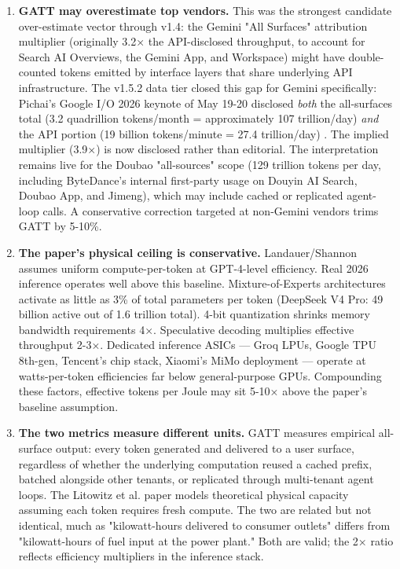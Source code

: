 \documentclass[11pt,a4paper]{article}
\begin{document}
\begin{enumerate}
  \item \textbf{GATT may overestimate top vendors.} This was the strongest candidate over-estimate vector through v1.4: the Gemini "All Surfaces" attribution multiplier (originally 3.2× the API-disclosed throughput, to account for Search AI Overviews, the Gemini App, and Workspace) might have double-counted tokens emitted by interface layers that share underlying API infrastructure. The v1.5.2 data tier closed this gap for Gemini specifically: Pichai's Google I/O 2026 keynote of May 19-20 disclosed \emph{both} the all-surfaces total (3.2 quadrillion tokens/month = approximately 107 trillion/day) \emph{and} the API portion (19 billion tokens/minute = 27.4 trillion/day) \cite{pichai2026io}. The implied multiplier (3.9×) is now disclosed rather than editorial. The interpretation remains live for the Doubao "all-sources" scope (129 trillion tokens per day, including ByteDance's internal first-party usage on Douyin AI Search, Doubao App, and Jimeng), which may include cached or replicated agent-loop calls. A conservative correction targeted at non-Gemini vendors trims GATT by 5-10\%.
  \item \textbf{The paper's physical ceiling is conservative.} Landauer/Shannon assumes uniform compute-per-token at GPT-4-level efficiency. Real 2026 inference operates well above this baseline. Mixture-of-Experts architectures activate as little as 3\% of total parameters per token (DeepSeek V4 Pro: 49 billion active out of 1.6 trillion total). 4-bit quantization shrinks memory bandwidth requirements 4×. Speculative decoding multiplies effective throughput 2-3×. Dedicated inference ASICs --- Groq LPUs, Google TPU 8th-gen, Tencent's chip stack, Xiaomi's MiMo deployment --- operate at watts-per-token efficiencies far below general-purpose GPUs. Compounding these factors, effective tokens per Joule may sit 5-10× above the paper's baseline assumption.
  \item \textbf{The two metrics measure different units.} GATT measures empirical all-surface output: every token generated and delivered to a user surface, regardless of whether the underlying computation reused a cached prefix, batched alongside other tenants, or replicated through multi-tenant agent loops. The Litowitz et al. paper models theoretical physical capacity assuming each token requires fresh compute. The two are related but not identical, much as "kilowatt-hours delivered to consumer outlets" differs from "kilowatt-hours of fuel input at the power plant." Both are valid; the 2× ratio reflects efficiency multipliers in the inference stack.
\end{enumerate}
\end{document}
